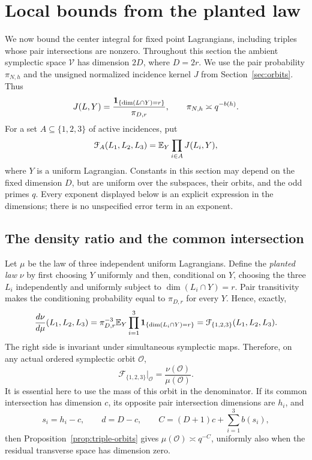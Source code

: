 \section{Local bounds from the planted law}\label{sec:planted}

We now bound the center integral for fixed point Lagrangians, including
triples whose pair intersections are nonzero.  Throughout this section the
ambient symplectic space $\mathcal V$ has dimension $2D$, where $D=2r$.
We use the pair probability $\pi_{N,h}$ and the unsigned normalized
incidence kernel $J$ from Section~\ref{sec:orbits}.  Thus
\[
 J(L,Y)=\frac{\mathbf 1_{\{\dim(L\cap Y)=r\}}}{\pi_{D,r}},
 \qquad \pi_{N,h}\asymp q^{-b(h)}.
\]
For a set $A\subseteq\{1,2,3\}$ of active incidences, put
\begin{equation}\label{eq:planted-face-factor}
 \mathcal F_A(L_1,L_2,L_3)
   =\mathbb E_Y\prod_{i\in A}J(L_i,Y),
\end{equation}
where $Y$ is a uniform Lagrangian.  Constants in this section may depend
on the fixed dimension $D$, but are uniform over the subspaces, their
orbits, and the odd primes $q$.  Every exponent displayed below is an
explicit expression in the dimensions; there is no unspecified error
term in an exponent.

\subsection{The density ratio and the common intersection}

Let $\mu$ be the law of three independent uniform Lagrangians.  Define
the \emph{planted law} $\nu$ by first choosing $Y$ uniformly and then,
conditional on $Y$, choosing the three $L_i$ independently and uniformly
subject to $\dim(L_i\cap Y)=r$.  Pair transitivity makes the conditioning
probability equal to $\pi_{D,r}$ for every $Y$.  Hence, exactly,
\begin{equation}\label{eq:planted-density}
 \frac{d\nu}{d\mu}(L_1,L_2,L_3)
 =\pi_{D,r}^{-3}\mathbb E_Y
       \prod_{i=1}^3\mathbf 1_{\{\dim(L_i\cap Y)=r\}}
 =\mathcal F_{\{1,2,3\}}(L_1,L_2,L_3).
\end{equation}
The right side is invariant under simultaneous symplectic maps.
Therefore, on any actual ordered symplectic orbit $\mathcal O$,
\begin{equation}\label{eq:planted-orbit-ratio}
 \mathcal F_{\{1,2,3\}}\big|_{\mathcal O}
     =\frac{\nu(\mathcal O)}{\mu(\mathcal O)}.
\end{equation}
It is essential here to use the mass of this orbit in the denominator.
If its common intersection has dimension $c$, its opposite pair
intersection dimensions are $h_i$, and
\begin{equation}\label{eq:planted-local-dimensions}
 s_i=h_i-c,\qquad d=D-c,\qquad
 C=(D+1)c+\sum_{i=1}^3 b(s_i),
\end{equation}
then Proposition~\ref{prop:triple-orbits} gives
$\mu(\mathcal O)\asymp q^{-C}$, uniformly also when the residual
transverse space has dimension zero.

